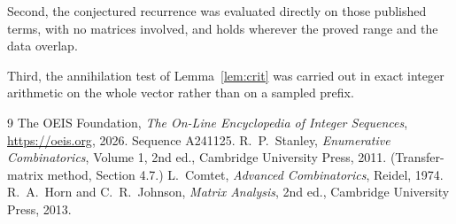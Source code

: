 \documentclass[11pt,a4paper]{article}
\theoremstyle{plain}
\theoremstyle{definition}
\begin{document}
Second, the conjectured recurrence was evaluated directly on those published terms, with no
matrices involved, and holds wherever the proved range and the data overlap.

Third, the annihilation test of Lemma~\ref{lem:crit} was carried out in exact integer
arithmetic on the whole vector rather than on a sampled prefix.

\begin{thebibliography}{9}
 The OEIS Foundation, \emph{The On-Line Encyclopedia of Integer
Sequences}, \url{https://oeis.org}, 2026. Sequence A241125.
 R.~P.~Stanley, \emph{Enumerative Combinatorics}, Volume 1, 2nd ed.,
Cambridge University Press, 2011. (Transfer-matrix method, Section 4.7.)
 L.~Comtet, \emph{Advanced Combinatorics}, Reidel, 1974.
 R.~A.~Horn and C.~R.~Johnson, \emph{Matrix Analysis}, 2nd ed., Cambridge
University Press, 2013.
\end{thebibliography}
\end{document}
